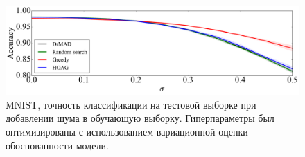     \begin{figure}

    \includegraphics[width=\linewidth]{plots/hyperparams/Fig_noise.pdf}

    \caption{MNIST, точность классификации на тестовой выборке при добавлении шума в обучающую выборку. Гиперпараметры был оптимизированы с использованием вариационной оценки обоснованности модели.}
    \label{fig:noise}
    \end{figure}






